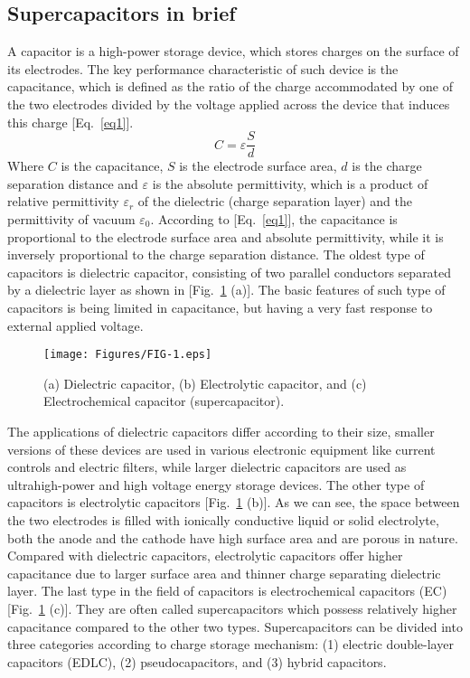 \documentclass[reprint,amsmath,amssymb,aps,floatfix,
]{revtex4-2}
\begin{document}
\subsection{\label{sec:level3}Supercapacitors in brief}
A capacitor is a high-power storage device, which stores charges on the surface of its electrodes.\cite{Gogotsi2018} The key performance characteristic of such device is the capacitance, which is defined as the ratio of the charge accommodated by one of the two electrodes divided by the voltage applied across the device that induces this charge [Eq.~\ref{eq1}].
\begin{equation} \label{eq1}
    C =\varepsilon\frac{S}{d}
\end{equation}
Where $C$ is the capacitance, $S$ is the electrode surface area, $d$ is the charge separation distance and $\varepsilon$ is the absolute permittivity, which is a product of relative permittivity $\varepsilon_r$ of the dielectric (charge separation layer) and the permittivity of vacuum $\varepsilon_0$. According to [Eq.~\ref{eq1}], the capacitance is proportional to the electrode surface area and absolute permittivity, while it is inversely proportional to the charge separation distance. The oldest type of capacitors is dielectric  capacitor, consisting of two parallel conductors separated by a dielectric layer as shown in [Fig.~\ref{fig:fig1} (a)]. The basic features of such type of capacitors is being limited in capacitance, but having a very fast response to external applied voltage.
\begin{figure}[t]
    \centering
    \texttt{[image: Figures/FIG-1.eps]}
    \caption{\label{fig:fig1} (a) Dielectric capacitor, (b) Electrolytic capacitor, and (c) Electrochemical capacitor (supercapacitor).}
    \end{figure}
The applications of dielectric capacitors differ according to their size, smaller versions of these devices are used in various electronic equipment like current controls and electric filters, while larger dielectric capacitors are used as ultrahigh-power and high voltage energy storage devices. The other type of capacitors is electrolytic capacitors [Fig.~\ref{fig:fig1} (b)]. As we can  see, the space between the two electrodes is filled with ionically conductive liquid or solid electrolyte, both the anode and the cathode have high surface area and are porous in nature. Compared with dielectric capacitors, electrolytic capacitors offer higher capacitance due to larger surface area and thinner charge separating dielectric layer. The last type in the field of capacitors is electrochemical capacitors (EC) [Fig.~\ref{fig:fig1} (c)]. They are often called supercapacitors which possess relatively higher capacitance compared to the other two types. Supercapacitors can be divided into three categories according to charge storage mechanism: (1) electric double-layer capacitors (EDLC), (2) pseudocapacitors, and (3) hybrid capacitors.
\end{document}
